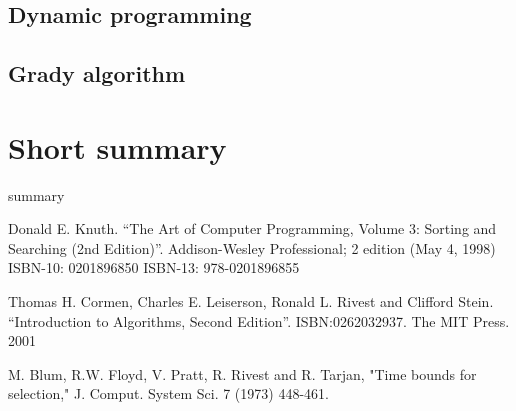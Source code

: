 \documentclass{article}
\begin{document}
\subsection{Dynamic programming}

\subsection{Grady algorithm}

\section{Short summary} 
summary

\begin{thebibliography}{99}

Donald E. Knuth. ``The Art of Computer Programming, Volume 3: Sorting and Searching (2nd Edition)''. Addison-Wesley Professional; 2 edition (May 4, 1998) ISBN-10: 0201896850 ISBN-13: 978-0201896855

Thomas H. Cormen, Charles E. Leiserson, Ronald L. Rivest and Clifford Stein. 
``Introduction to Algorithms, Second Edition''. ISBN:0262032937. The MIT Press. 2001

M. Blum, R.W. Floyd, V. Pratt, R. Rivest and R. Tarjan, "Time bounds for selection," J. Comput. System Sci. 7 (1973) 448-461.

\end{thebibliography}

\ifx\wholebook\relax\else
\end{document}
